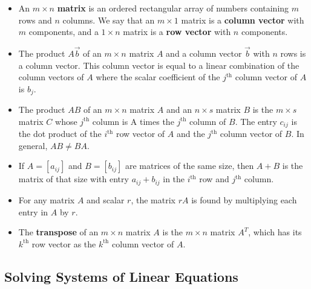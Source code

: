 \documentclass[11pt]{amsart}
\begin{document}
\begin{itemize}

	\item{
		An $m \times n$ \textbf{matrix} is an ordered rectangular array of numbers containing $m$ rows and $n$ columns. We say that an
		$m \times 1$ matrix is a \textbf{column vector} with $m$ components, and a $1 \times n$ matrix is a \textbf{row vector} with $n$
		components.
	}
	\item{
		The product $A\vec{b}$ of an $m \times n$ matrix $A$ and a column vector $\vec{b}$ with $n$ rows is a column vector. This column
		vector is equal to a linear combination of the column vectors of $A$ where the scalar coefficient of the $j^\text{th}$ column vector
		of $A$ is $b_j$.
	}
	\item{
		The product $AB$ of an $m \times n$ matrix $A$ and an $n \times s$ matrix $B$ is the $m \times s$ matrix $C$ whose $j^\text{th}$
		column is A times the $j^\text{th}$ column of $B$. The entry $c_{ij}$ is the dot product of the $i^\text{th}$ row vector of $A$ and the
		$j^\text{th}$ column vector of $B$. In general, $AB \neq BA$.
	}
	\item{
		If $A = [a_{ij}]$ and $B = [b_{ij}]$ are matrices of the same size, then $A + B$ is the matrix of that size with entry $a_{ij} + b_{ij}$ in the
		$i^\text{th}$ row and $j^\text{th}$ column.
	}
	\item{
		For any matrix $A$ and scalar $r$, the matrix $rA$ is found by multiplying each entry in $A$ by $r$.
	}
	\item{
		The \textbf{transpose} of an $m \times n$ matrix $A$ is the $m \times n$ matrix $A^T$, which has its $k^\text{th}$ row vector as the
		$k^\text{th}$ column vector of $A$.
	}
	
\end{itemize}

\subsection{Solving Systems of Linear Equations}
\end{document}
